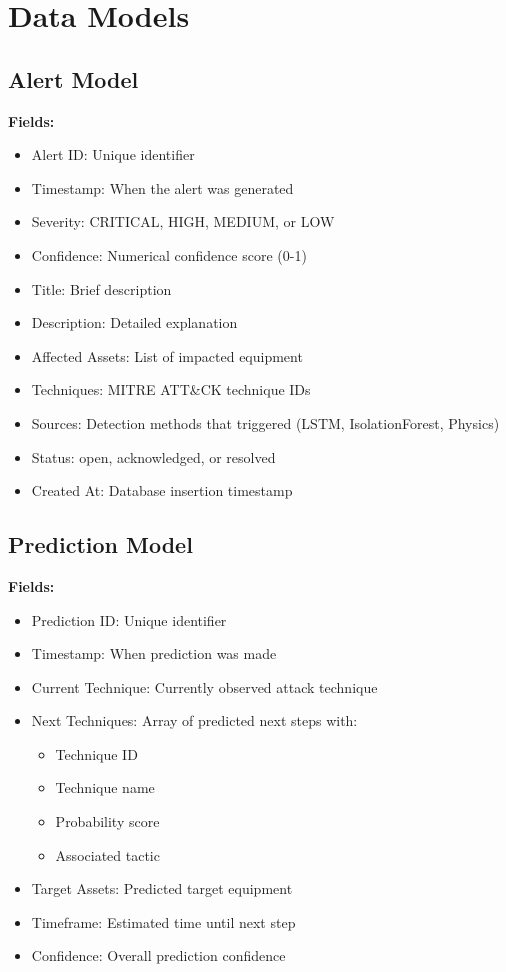 \documentclass[12pt,a4paper]{article}
\begin{document}
\section{Data Models}

\subsection{Alert Model}

\textbf{Fields:}
\begin{itemize}[leftmargin=1cm,itemsep=0pt]
    \item Alert ID: Unique identifier
    \item Timestamp: When the alert was generated
    \item Severity: CRITICAL, HIGH, MEDIUM, or LOW
    \item Confidence: Numerical confidence score (0-1)
    \item Title: Brief description
    \item Description: Detailed explanation
    \item Affected Assets: List of impacted equipment
    \item Techniques: MITRE ATT\&CK technique IDs
    \item Sources: Detection methods that triggered (LSTM, IsolationForest, Physics)
    \item Status: open, acknowledged, or resolved
    \item Created At: Database insertion timestamp
\end{itemize}

\subsection{Prediction Model}

\textbf{Fields:}
\begin{itemize}[leftmargin=1cm,itemsep=0pt]
    \item Prediction ID: Unique identifier
    \item Timestamp: When prediction was made
    \item Current Technique: Currently observed attack technique
    \item Next Techniques: Array of predicted next steps with:
    \begin{itemize}
        \item Technique ID
        \item Technique name
        \item Probability score
        \item Associated tactic
    \end{itemize}
    \item Target Assets: Predicted target equipment
    \item Timeframe: Estimated time until next step
    \item Confidence: Overall prediction confidence
\end{itemize}
\end{document}
